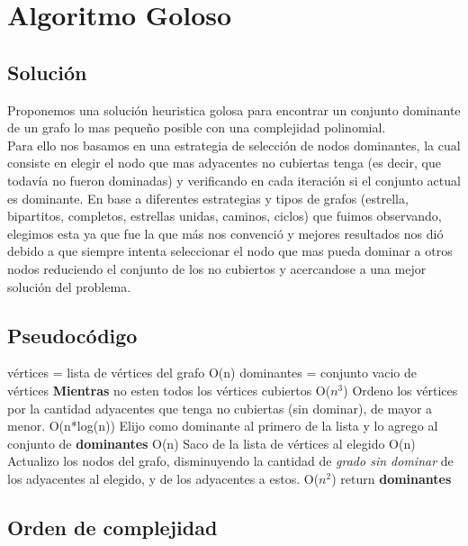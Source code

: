 \section{Algoritmo Goloso}

\subsection{Soluci\'on}

Proponemos una solución heuristica golosa para encontrar un conjunto dominante de un grafo lo mas pequeño posible con una complejidad polinomial.\\
Para ello nos basamos en una estrategia de selección de nodos dominantes, la cual consiste en elegir el nodo que mas adyacentes no cubiertas tenga (es decir, que todavía no fueron dominadas) y verificando en cada iteración si el conjunto actual es dominante. En base a diferentes estrategias y tipos de grafos (estrella, bipartitos, completos, estrellas unidas, caminos, ciclos) que fuimos observando, elegimos esta ya que fue la que más nos convenció y mejores resultados nos dió debido a que siempre intenta seleccionar el nodo que mas pueda dominar a otros nodos reduciendo el conjunto de los no cubiertos y acercandose a una mejor solución del problema. 

\subsection{Pseudocódigo}

\begin{codebox}
\li	vértices = lista de vértices del grafo	\RComment O(n)
\li	dominantes = conjunto vacio de vértices	
\li	\textbf{Mientras} no esten todos los vértices cubiertos \Do \RComment O($n^3$)
\li 		Ordeno los vértices por la cantidad adyacentes que tenga no cubiertas (sin dominar), de mayor a menor. \RComment O(n*log(n))
\li 		Elijo como dominante al primero de la lista y lo agrego al conjunto de \textbf{dominantes} \RComment O(n)
\li 		Saco de la lista de vértices al elegido \RComment O(n)
\li 		Actualizo los nodos del grafo, disminuyendo la cantidad de \textit{grado sin dominar} de los adyacentes al elegido, y de los adyacentes a estos. \RComment O($n^2$)
\End
\li	return \textbf{dominantes}
\end{codebox}

\subsection{Orden de complejidad}

